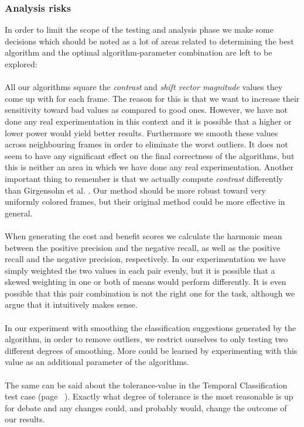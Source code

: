 \documentclass[12pt]{article}
\begin{document}
\subsubsection{Analysis risks}
%
In order to limit the scope of the testing and analysis phase we make some decisions which should be noted as a lot of areas related to determining the best algorithm and the optimal algorithm-parameter combination are left to be explored:\\
\\
All our algorithms square the \textit{contrast} and \textit{shift vector magnitude} values they come up with for each frame. The reason for this is that we want to increase their sensitivity toward bad values as compared to good ones. However, we have not done any real experimentation in this context and it is possible that a higher or lower power would yield better results. Furthermore we smooth these values across neighbouring frames in order to eliminate the worst outliers. It does not seem to have any significant effect on the final correctness of the algorithms, but this is neither an area in which we have done any real experimentation. Another important thing to remember is that we actually compute \textit{contrast} differently than Girgensohn et al. \cite{Girgensohn:2000:SAH:354401.354415}. Our method should be more robust toward very uniformly colored frames, but their original method could be more effective in general.\\
\\
When generating the cost and benefit scores we calculate the harmonic mean between the positive precision and the negative recall, as well as the positive recall and the negative precision, respectively. In our experimentation we have simply weighted the two values in each pair evenly, but it is possible that a skewed weighting in one or both of means would perform differently. It is even possible that this pair combination is not the right one for the task, although we argue that it intuitively makes sense.\\
\\
In our experiment with smoothing the classification suggestions generated by the algorithm, in order to remove outliers, we restrict ourselves to only testing two different degrees of smoothing. More could be learned by experimenting with this value as an additional parameter of the algorithms.\\
\\
The same can be said about the tolerance-value in the Temporal Classification test case (page ~\pageref{sec:tctestcase}). Exactly what degree of tolerance is the most reasonable is up for debate and any changes could, and probably would, change the outcome of our results.\\
\end{document}
